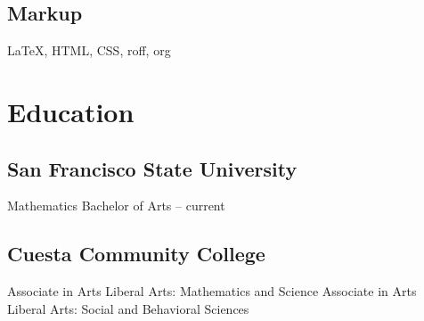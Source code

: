 \subsection{Markup}
{\LaTeX}, HTML, CSS, roff, org

\section{Education}
\subsection{San Francisco State University}
Mathematics Bachelor of Arts -- current
\subsection{Cuesta Community College}
Associate in Arts
Liberal Arts: Mathematics and Science
Associate in Arts
Liberal Arts: Social and Behavioral Sciences




